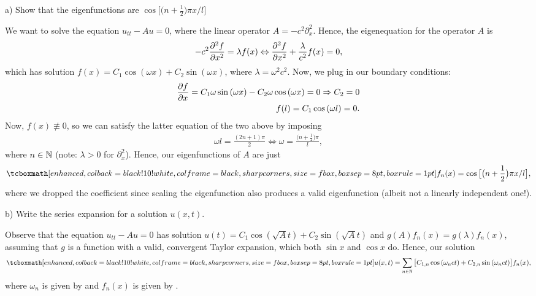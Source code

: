 \def\duedate{10/13/22}
\def\HWnum{5}



    


a) Show that the eigenfunctions are $\cos{\big[ \big( n+\frac{1}{2} \big) \pi x / l \big]}$

We want to solve the equation $u_{tt} - Au = 0$, where the linear operator $A = -c^2\partial_{x}^2$.
Hence, the eigenequation for the operator $A$ is 
\begin{eqnarray}
    \label{eq:eigeneq}
    -c^2 \pdv[2]{f}{x} = \lambda f(x) \Leftrightarrow \pdv[2]{f}{x} + \frac{\lambda}{c^2}f(x) = 0
,\end{eqnarray}
which has solution $f(x) = C_1 \cos{(\omega x)} + C_{2} \sin{(\omega x)}$, where $\lambda = \omega^2 c^2$.
Now, we plug in our boundary conditions:
\begin{align}
    \label{eq:solve-C2}
    \pdv{f}{x} = C_{1}\omega \sin{(\omega x)} - C_{2}\omega\cos{(\omega x)} = 0 \Rightarrow C_{2} = 0 \\
    f(l) = C_1 \cos{(\omega l)} = 0
.\end{align}
Now, $f(x) \not\equiv 0$, so we can satisfy the latter equation of the two above by imposing
\begin{eqnarray}
    \label{eq:solve-omega}
    \omega l = \frac{(2n+1)\pi}{2} \Leftrightarrow \omega = \frac{\big(n + \frac{1}{2}\big)\pi}{l}
,\end{eqnarray}
where $n \in \mathbb{N}$ (note: $\lambda > 0$ for $\partial_{x}^2$).
Hence, our eigenfunctions of $A$ are just
\begin{eqnarray}
    \label{eq:eigenfuncs}
    \eqbox{
    f_{n}(x) = \cos{\big[ \big(n+\frac{1}{2}\big)\pi x / l \big]}
}
,\end{eqnarray}
where we dropped the coefficient since scaling the eigenfunction also produces a valid eigenfunction (albeit not a linearly independent one!).

b) Write the series expansion for a solution $u(x,t)$.

Observe that the equation $u_{tt} - Au = 0$ has solution $u(t) = C_1 \cos{(\sqrt{A} t)} + C_2 \sin{(\sqrt{A} t)}$ and $g(A)f_{n}(x) = g(\lambda)f_{n}(x)$, assuming that $g$ is a function with a valid, convergent Taylor expansion, which both $\sin{x}$ and $\cos{x}$ do.
Hence, our solution
\begin{eqnarray}
    \label{eq:solution-general}
    \eqbox{
    u(x,t) = \sum_{n \in \naturals} \big[ C_{1,n} \cos{(\omega_{n}c t)} + C_{2,n} \sin{(\omega_{n} ct)} \big] f_{n}(x)
}
,\end{eqnarray}
where $\omega_{n}$ is given by  and $f_{n}(x)$ is given by .


